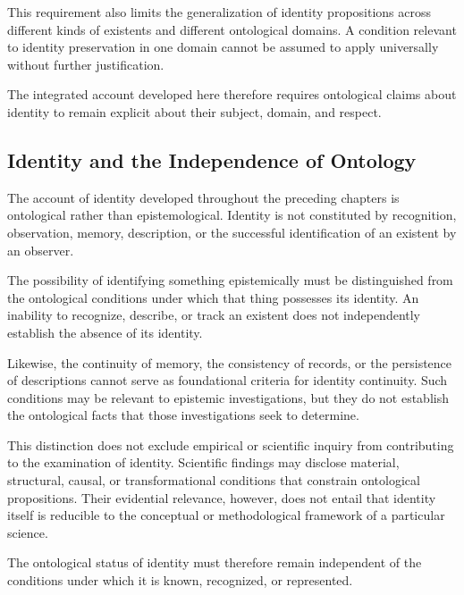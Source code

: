 This requirement also limits the generalization of
identity propositions across different kinds of existents
and different ontological domains. A condition relevant
to identity preservation in one domain cannot be assumed
to apply universally without further justification.

The integrated account developed here therefore requires
ontological claims about identity to remain explicit about
their subject, domain, and respect.


\subsection{Identity and the Independence of Ontology}

The account of identity developed throughout the preceding
chapters is ontological rather than epistemological. Identity
is not constituted by recognition, observation, memory,
description, or the successful identification of an existent
by an observer.

The possibility of identifying something epistemically
must be distinguished from the ontological conditions under
which that thing possesses its identity. An inability to
recognize, describe, or track an existent does not
independently establish the absence of its identity.

Likewise, the continuity of memory, the consistency of
records, or the persistence of descriptions cannot serve
as foundational criteria for identity continuity. Such
conditions may be relevant to epistemic investigations,
but they do not establish the ontological facts that those
investigations seek to determine.

This distinction does not exclude empirical or scientific
inquiry from contributing to the examination of identity.
Scientific findings may disclose material, structural,
causal, or transformational conditions that constrain
ontological propositions. Their evidential relevance,
however, does not entail that identity itself is reducible
to the conceptual or methodological framework of a
particular science.

The ontological status of identity must therefore remain
independent of the conditions under which it is known,
recognized, or represented.


